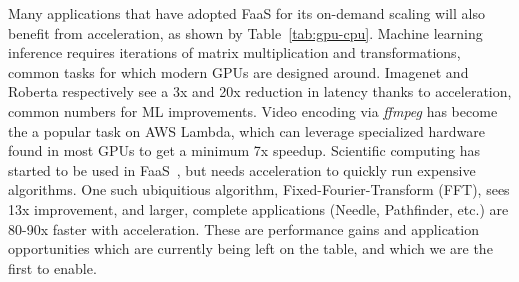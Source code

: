 
Many applications that have adopted FaaS for its on-demand scaling will also benefit from acceleration, as shown by Table~\ref{tab:gpu-cpu}.
Machine learning inference requires iterations of matrix multiplication and transformations, common tasks for which modern GPUs are designed around.
Imagenet and Roberta respectively see a 3x and 20x reduction in latency thanks to acceleration, common numbers for ML improvements.
Video encoding via \emph{ffmpeg} has become the a popular task on AWS Lambda, which can leverage specialized hardware found in most GPUs to get a minimum 7x speedup.
Scientific computing has started to be used in FaaS~\cite{john_sweep_2019,mocskos_faaster_2018,werner2018serverless,shankar2020serverless}, but needs acceleration to quickly run expensive algorithms.
One such ubiquitious algorithm, Fixed-Fourier-Transform (FFT), sees 13x improvement, and larger, complete applications (Needle, Pathfinder, etc.) are 80-90x faster with acceleration.
These are performance gains and application opportunities which are currently being left on the table, and which we are the first to enable.

\begin{comment}
Using disaggregated GPUs~\cite{naranjo2020accelerated,fingler2022dgsf} is a common tactic to maximize device utilization from bursty FaaS functions.
The interposition layer virtualizes the device and forwards requests to the remote GPU, timesharing resources between clients.
These works fail to enable device concurrency between several functions, and do not consider queuing for either fairness between functions or encouraging device locality.

The common approach for ML inference~\cite{pemberton2022kernel,ng2023paella} has the control plane break apart tasks into GPU and CPU-specific sections, and schedules them internally.
While achieving high utilization and throughput, they abandon the black-box nature of serverless and do not work with different workload classes.
Other work~\cite{gu2023fast} has profiled inference tasks to learn their compute usage to schedule concurrent invocations without interference.
It does not resolve the memory exhaustion problem, and cannot predict compute usage of other functions which can vary with each input.
\end{comment}

